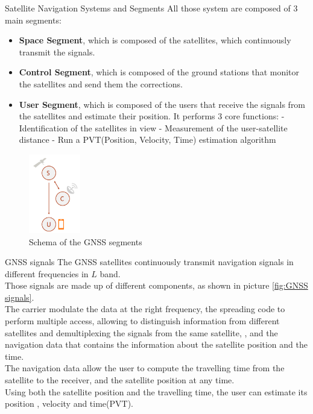 \begin{section}{Satellite Navigation Systems and Segments}
    All those system are composed of 3 main segments:
    \begin{itemize}
      \item \textbf{Space Segment}, which is composed of the satellites, which continuously transmit
        the signals.
      \item \textbf{Control Segment}, which is composed of the ground stations that monitor the 
        satellites and send them the corrections.
      \item \textbf{User Segment}, which is composed of the users that receive the signals from the
        satellites and estimate their position. It performs 3 core functions:
        \subitem - Identification of the satellites in view
        \subitem - Measurement of the user-satellite distance
        \subitem - Run a PVT(Position, Velocity, Time) estimation algorithm
    \end{itemize}
    \begin{figure}[h]
      \centering
      \includegraphics[width=0.2\textwidth]{img/wireless/GNSS segments.png}
      \caption{Schema of the GNSS segments}
      \label{fig:GNSS segments}
    \end{figure}
    \begin{subsection}{GNSS signals}
      The GNSS satellites continuously transmit navigation signals in different frequencies in $L$ 
      band.\\
      Those signals are made up of different components, as shown in picture \ref{fig:GNSS signals}.\\
      The carrier modulate the data at the right frequency, the spreading code to perform multiple
      access, allowing to distinguish information from different satellites and demultiplexing the
      signals from the same satellite, , and the navigation data that contains the information 
      about the satellite position and the time.\\

      The navigation data allow the user to compute the travelling time from the satellite to the receiver,
      and the satellite position at any time.\\
      Using both the satellite position and the travelling time, the user can estimate its position
      , velocity and time(PVT).\\


\end{subsection}
\end{section}
